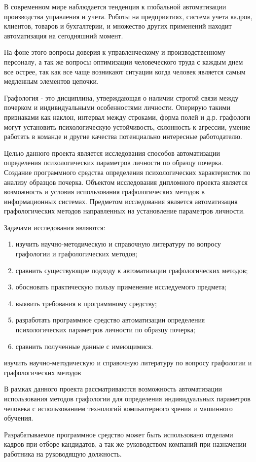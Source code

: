 \label{sec:intro}

В современном мире наблюдается тенденция к глобальной автоматизации производства управления и учета. Роботы на предприятиях, система учета кадров, клиентов, товаров и бухгалтерии, и множество других применений находит автоматизация на сегодняшний момент.

На фоне этого вопросы доверия к управленческому и производственному персоналу, а так же вопросы оптимизации человеческого труда с каждым днем все острее, так как все чаще возникают ситуации когда человек
является самым медленным элементов цепочки.

Графология - это дисциплина, утверждающая о наличии строгой связи между почерком и индивидуальными особенностями личности. Оперирую такими признаками как наклон, интервал между строками, форма полей и д.р. графологи могут установить психологическую устойчивость, склонность к агрессии, умение работать в команде и другие качества потенциально интересные работодателю.

Целью данного проекта является исследования способов автоматизации определения психологических параметров личности по образцу почерка. Создание программного средства определения психологических характеристик по анализу образцов почерка.  
Объектом исследования дипломного проекта является возможность и условия использования графологических методов в информационных системах.
Предметом исследования является автоматизация графологических методов направленных на установление параметров личности.

Задачами исследования являются:
\begin{enumerate}
  \item изучить научно-методическую и справочную литературу по вопросу графологии и графологических методов;
  \item сравнить существующие подходу к автоматизации графологических методов;
  \item обосновать практическую пользу применение исследуемого предмета;
  \item выявить требования в программному средству;
  \item разработать программное средство автоматизации определения психологических параметров личности по образцу почерка;
  \item сравнить полученные данные с имеющимися.
\end{enumerate}
изучить научно-методическую и справочную литературу по вопросу графологии и графологических методов

В рамках данного проекта рассматриваются возможность автоматизации использования методов графологии для определения индивидуальных параметров человека с использованием технологий компьютерного зрения и машинного обучения.

Разрабатываемое программное средство может быть использовано отделами кадров при отборе кандидатов, а так же руководством компаний при назначении работника на руководящую должность.